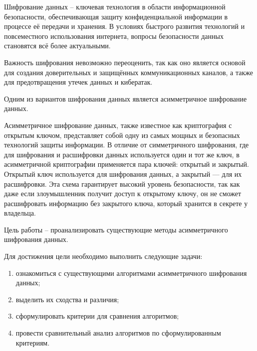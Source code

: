 
Шифрование данных  -- ключевая технология в области информационной безопасности, обеспечивающая защиту конфиденциальной информации в процессе её передачи и хранения. В условиях быстрого развития технологий и повсеместного использования интернета, вопросы безопасности данных становятся всё более актуальными. 

Важность шифрования невозможно переоценить, так как оно является основой для создания доверительных и защищённых коммуникационных каналов, а также для предотвращения утечек данных и кибератак.

Одним из вариантов шифрования данных является асимметричное шифрование данных.

Асимметричное шифрование данных, также известное как криптография с открытым ключом, представляет собой одну из самых мощных и безопасных технологий защиты информации. В отличие от симметричного шифрования, где для шифрования и расшифровки данных используется один и тот же ключ, в асимметричной криптографии применяется пара ключей: открытый и закрытый. Открытый ключ используется для шифрования данных, а закрытый — для их расшифровки. Эта схема гарантирует высокий уровень безопасности, так как даже если злоумышленник получит доступ к открытому ключу, он не сможет расшифровать информацию без закрытого ключа, который хранится в секрете у владельца.~\cite{asim-kasp}

Цель работы -- проанализировать существующие методы асимметричного шифрования данных.

Для достижения цели необходимо выполнить следующие задачи:
\begin{enumerate}
	\item ознакомиться с существующими алгоритмами асимметричного шифрования данных;
	\item выделить их сходства и различия;
	\item сформулировать критерии для сравнения алгоритмов;
	\item провести сравнительный анализ алгоритмов по сформулированным критериям.
\end{enumerate}